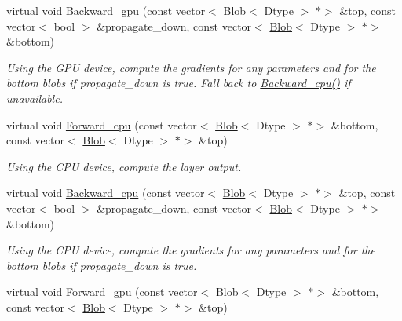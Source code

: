 \begin{DoxyCompactItemize}
virtual void \mbox{\hyperlink{classcaffe_1_1_crop_layer_a5797567b3f3c31a4b59b636f80c0040e}{Backward\+\_\+gpu}} (const vector$<$ \mbox{\hyperlink{classcaffe_1_1_blob}{Blob}}$<$ Dtype $>$ $\ast$$>$ \&top, const vector$<$ bool $>$ \&propagate\+\_\+down, const vector$<$ \mbox{\hyperlink{classcaffe_1_1_blob}{Blob}}$<$ Dtype $>$ $\ast$$>$ \&bottom)
\begin{DoxyCompactList}\small\item\em Using the G\+PU device, compute the gradients for any parameters and for the bottom blobs if propagate\+\_\+down is true. Fall back to \mbox{\hyperlink{classcaffe_1_1_crop_layer_ab73f11ec5c3927435ab9c7e1706919cd}{Backward\+\_\+cpu()}} if unavailable. \end{DoxyCompactList}\item 
\mbox{\label{classcaffe_1_1_crop_layer_a57ab1aa803eebb7242d79967116f1068}} 
virtual void \mbox{\hyperlink{classcaffe_1_1_crop_layer_a57ab1aa803eebb7242d79967116f1068}{Forward\+\_\+cpu}} (const vector$<$ \mbox{\hyperlink{classcaffe_1_1_blob}{Blob}}$<$ Dtype $>$ $\ast$$>$ \&bottom, const vector$<$ \mbox{\hyperlink{classcaffe_1_1_blob}{Blob}}$<$ Dtype $>$ $\ast$$>$ \&top)
\begin{DoxyCompactList}\small\item\em Using the C\+PU device, compute the layer output. \end{DoxyCompactList}\item 
\mbox{\label{classcaffe_1_1_crop_layer_a22590c9c8d1cfd766dccadb5b4bfd778}} 
virtual void \mbox{\hyperlink{classcaffe_1_1_crop_layer_a22590c9c8d1cfd766dccadb5b4bfd778}{Backward\+\_\+cpu}} (const vector$<$ \mbox{\hyperlink{classcaffe_1_1_blob}{Blob}}$<$ Dtype $>$ $\ast$$>$ \&top, const vector$<$ bool $>$ \&propagate\+\_\+down, const vector$<$ \mbox{\hyperlink{classcaffe_1_1_blob}{Blob}}$<$ Dtype $>$ $\ast$$>$ \&bottom)
\begin{DoxyCompactList}\small\item\em Using the C\+PU device, compute the gradients for any parameters and for the bottom blobs if propagate\+\_\+down is true. \end{DoxyCompactList}\item 
\mbox{\label{classcaffe_1_1_crop_layer_a507c00c0d53094e5e885ba9c22028ebb}} 
virtual void \mbox{\hyperlink{classcaffe_1_1_crop_layer_a507c00c0d53094e5e885ba9c22028ebb}{Forward\+\_\+gpu}} (const vector$<$ \mbox{\hyperlink{classcaffe_1_1_blob}{Blob}}$<$ Dtype $>$ $\ast$$>$ \&bottom, const vector$<$ \mbox{\hyperlink{classcaffe_1_1_blob}{Blob}}$<$ Dtype $>$ $\ast$$>$ \&top)

\end{DoxyCompactItemize}
